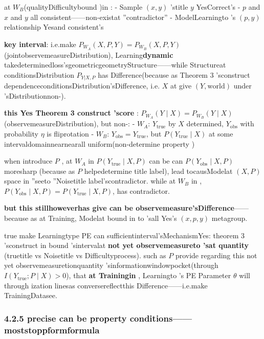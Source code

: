 \documentclass[
  12pt,
]{article}
\begin{document}
at  \(W_B\)(qualityDifficultybound )in :  - Sample \((x, y)\) 'stitle  \(y\) YesCorrect's -
\(p\) and  \(x\) and  \(y\) all consistent------non-existat ''contradictor'' - ModelLearningto 's
\((p, y)\) relationship Yesand consistent's

\textbf{key interval}: i.e.make 
\(P_{W_A}(X, P, Y) = P_{W_B}(X, P, Y)\)(jointobservemeasureDistribution), Learning\textbf{dynamic }takedeterminedloss'sgeometricgeometryStructure------while Structureat conditionsDistribution
\(P_{Y|X,P}\) has Difference(because as  Theorem 3 'sconstruct dependenceconditionsDistribution'sDifference, i.e.
\(X\) at give  \((Y, \text{world})\) under 'sDistributionnon-). 

\textbf{this Yes Theorem 3
construct 'score }: \(P_{W_A}(Y \mid X) = P_{W_B}(Y \mid X)\)(observemeasureDistribution), but non-: 
- \(W_A\): \(Y_{\text{true}}\) by  \(X\) determined,  \(Y_{\text{obs}}\)
with probability \(\eta\) is fliprotation -
\(W_B\): \(Y_{\text{obs}} = Y_{\text{true}}\), but 
\(P(Y_{\text{true}} \mid X)\) at some intervaldomainnearnearall uniform(non-determine property )

when introduce  \(P\) , at  \(W_A\) in  \(P(Y_{\text{true}} \mid X, P)\) can be can 
\(P(Y_{\text{obs}} \mid X, P)\) moresharp (because as  \(P\)
helpedetermine title label), lead tocausModelat  \((X, P)\)
space in ''seeto ''Noisetitle label'scontradictor. while at  \(W_B\)
in , \(P(Y_{\text{obs}} \mid X, P) = P(Y_{\text{true}} \mid X, P)\), has contradictor. 

\textbf{but this stillhoweverhas give can be observemeasure'sDifference}------because as at Training, Modelat bound in to 'sall Yes's
\((x, p, y)\) metagroup. 

true make Learningtype  PE can sufficientinterval'sMechanismYes: theorem  3
'sconstruct in bound 'sintervalat \textbf{not yet observemeasureto 'sat quantity }(truetitle  vs
Noisetitle  vs Difficultyprocess). such as  \(P\)
provide regarding this not yet observemeasuretionquantity 'sinformationwindowpocket(through 
\(I(Y_{\text{true}}; P \mid X) > 0\)), that \textbf{at Trainingin }, Learningto 's
PE Parameter \(\theta\)
will through ization linesas conversereflectthis Difference------i.e.make TrainingDatasee. 

\subsubsection{4.2.5
precise can be property conditions------moststoppformformula }\label{ux7cbeux786eux53efux533aux5206ux6027ux6761ux4ef6ux6700ux7ec8ux5f62ux5f0f}
\end{document}

